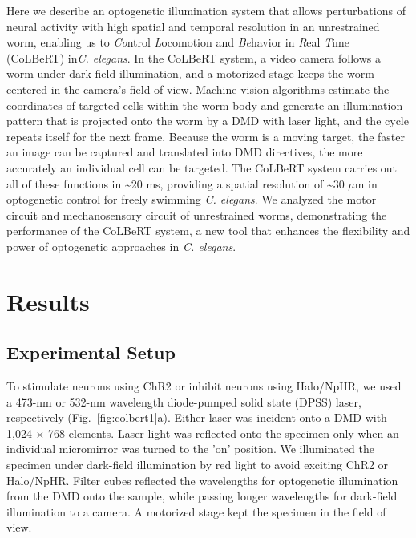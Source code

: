 Here we describe an optogenetic illumination system that allows perturbations of neural activity with high spatial and temporal resolution in an unrestrained worm, enabling us to \emph{Co}ntrol \emph{L}ocomotion and \emph{Be}havior in \emph{R}eal \emph{T}ime (CoLBeRT) in\textit{C. elegans}. In the CoLBeRT system, a video camera follows a worm under dark-field illumination, and a motorized stage keeps the worm centered in the camera's field of view. Machine-vision algorithms estimate the coordinates of targeted cells within the worm body and generate an illumination pattern that is projected onto the worm by a DMD with laser light, and the cycle repeats itself for the next frame. Because the worm is a moving target, the faster an image can be captured and translated into DMD directives, the more accurately an individual cell can be targeted. The CoLBeRT system carries out all of these functions in \textasciitilde20 ms, providing a spatial resolution of \textasciitilde30 $\mu$m in optogenetic control for freely swimming \textit{C. elegans}. We analyzed the motor circuit and mechanosensory circuit of unrestrained worms, demonstrating the performance of the CoLBeRT system, a new tool that enhances the flexibility and power of optogenetic approaches in \textit{C. elegans}.

\section{Results}
\subsection{Experimental Setup}
To stimulate neurons using ChR2 or inhibit neurons using Halo/NpHR, we used a 473-nm or 532-nm wavelength diode-pumped solid state (DPSS) laser, respectively  (Fig.~\ref{fig:colbert1}a). Either laser was incident onto a DMD with 1,024 × 768 elements. Laser light was reflected onto the specimen only when an individual micromirror was turned to the 'on' position. We illuminated the specimen under dark-field illumination by red light to avoid exciting ChR2 or Halo/NpHR. Filter cubes reflected the wavelengths for optogenetic illumination from the DMD onto the sample, while passing longer wavelengths for dark-field illumination to a camera. A motorized stage kept the specimen in the field of view.



